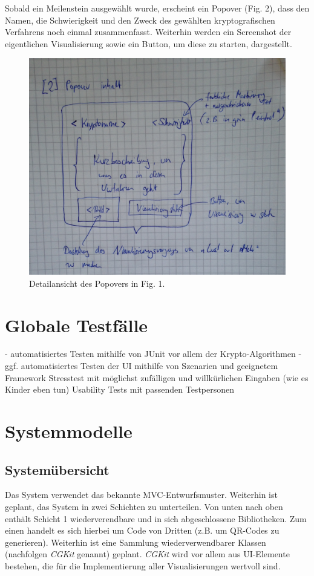\documentclass{article}
\begin{document}
Sobald ein Meilenstein ausgewählt wurde, erscheint ein Popover (Fig. 2), dass den Namen, die Schwierigkeit und den Zweck des gewählten kryptografischen Verfahrens noch einmal zusammenfasst. Weiterhin werden ein Screenshot der eigentlichen Visualisierung sowie ein Button, um diese zu starten, dargestellt.

\begin{figure}[H]
  \centering
    \includegraphics[width=\textwidth]{ui_welcome_popover-draft.jpg}
  \caption{Detailansicht des Popovers in Fig. 1.}
\end{figure}

\section{Globale Testfälle}
- automatisiertes Testen mithilfe von JUnit vor allem der Krypto-Algorithmen
- ggf. automatisiertes Testen der UI mithilfe von Szenarien und geeignetem Framework
Stresstest mit möglichst zufälligen und willkürlichen Eingaben (wie es Kinder eben tun)
Usability Tests mit passenden Testpersonen

\section{Systemmodelle}

\subsection{Systemübersicht}
Das System verwendet das bekannte MVC-Entwurfsmuster. Weiterhin ist geplant, das System in zwei Schichten zu unterteilen. Von unten nach oben enthält Schicht 1 wiederverendbare und in sich abgeschlossene Bibliotheken. Zum einen handelt es sich hierbei um Code von Dritten (z.B. um QR-Codes zu generieren). Weiterhin ist eine Sammlung wiederverwendbarer Klassen (nachfolgen {\it CGKit} genannt) geplant. {\it CGKit} wird vor allem aus UI-Elemente bestehen, die für die Implementierung aller Visualisierungen wertvoll sind.
\end{document}
